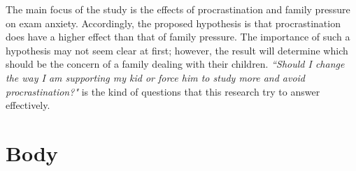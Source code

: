 \documentclass[12pt]{report}
\begin{document}
\begin{multicols}{2}
The main focus of the study is the effects of procrastination and family
pressure on exam anxiety. Accordingly, the proposed hypothesis is that
procrastination does have a higher effect than that of family pressure. The
importance of such a hypothesis may not seem clear at first; however, the result
will determine which should be the concern of a family dealing with their
children. \textit{``Should I change the way I am supporting my kid or force him
to study more and avoid procrastination?"} is the kind of questions that this
research try to answer effectively.

\end{multicols}

\chapter{Body}
\end{document}
